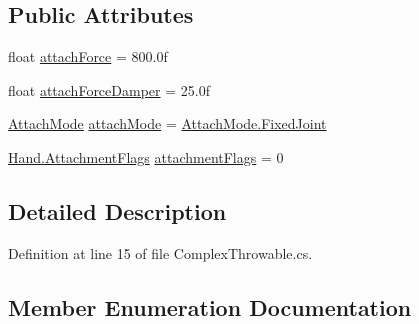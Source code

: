 \subsection*{Public Attributes}
\begin{DoxyCompactItemize}
\item 
float \mbox{\hyperlink{class_valve_1_1_v_r_1_1_interaction_system_1_1_complex_throwable_ace78cebf2593395beda7aba6d483297a}{attach\+Force}} = 800.\+0f
\item 
float \mbox{\hyperlink{class_valve_1_1_v_r_1_1_interaction_system_1_1_complex_throwable_a9d6bb0fbd46399b63e2f491ba37d5dea}{attach\+Force\+Damper}} = 25.\+0f
\item 
\mbox{\hyperlink{class_valve_1_1_v_r_1_1_interaction_system_1_1_complex_throwable_a3767479e716ee64bf8f7b2d5d46c67b7}{Attach\+Mode}} \mbox{\hyperlink{class_valve_1_1_v_r_1_1_interaction_system_1_1_complex_throwable_a58b4bbb34394f119cfcf82f94a241cb1}{attach\+Mode}} = \mbox{\hyperlink{class_valve_1_1_v_r_1_1_interaction_system_1_1_complex_throwable_a3767479e716ee64bf8f7b2d5d46c67b7a745602638f184063907e534fc67cf1f8}{Attach\+Mode.\+Fixed\+Joint}}
\item 
\mbox{\hyperlink{class_valve_1_1_v_r_1_1_interaction_system_1_1_hand_a61701f82b8f3fac8818954ec71804cb5}{Hand.\+Attachment\+Flags}} \mbox{\hyperlink{class_valve_1_1_v_r_1_1_interaction_system_1_1_complex_throwable_a362dd7342445f9dd29afb10efe2bbce7}{attachment\+Flags}} = 0
\end{DoxyCompactItemize}


\subsection{Detailed Description}


Definition at line 15 of file Complex\+Throwable.\+cs.



\subsection{Member Enumeration Documentation}
\mbox{\label{class_valve_1_1_v_r_1_1_interaction_system_1_1_complex_throwable_a3767479e716ee64bf8f7b2d5d46c67b7}} 
